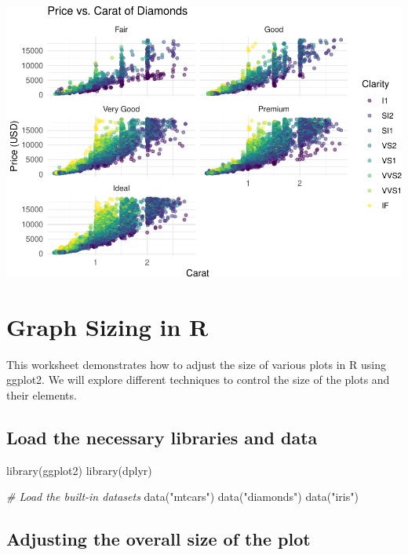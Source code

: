 \documentclass[
]{book}
\newenvironment{Shaded}{\begin{snugshade}}{\end{snugshade}}
\newcommand{\CommentTok}[1]{\textcolor[rgb]{0.56,0.35,0.01}{\textit{#1}}}
\newcommand{\FunctionTok}[1]{\textcolor[rgb]{0.00,0.00,0.00}{#1}}
\newcommand{\NormalTok}[1]{#1}
\newcommand{\StringTok}[1]{\textcolor[rgb]{0.31,0.60,0.02}{#1}}
\begin{document}
\includegraphics[width=1\linewidth]{graphformatting_files/figure-latex/unnamed-chunk-6-1}

\hypertarget{graph-sizing-in-r}{%
\section{Graph Sizing in R}\label{graph-sizing-in-r}}

This worksheet demonstrates how to adjust the size of various plots in R using ggplot2. We will explore different techniques to control the size of the plots and their elements.

\hypertarget{load-the-necessary-libraries-and-data}{%
\subsection{Load the necessary libraries and data}\label{load-the-necessary-libraries-and-data}}

\begin{Shaded}
\begin{Highlighting}[]
\FunctionTok{library}\NormalTok{(ggplot2)}
\FunctionTok{library}\NormalTok{(dplyr)}

\CommentTok{\# Load the built{-}in datasets}
\FunctionTok{data}\NormalTok{(}\StringTok{"mtcars"}\NormalTok{)}
\FunctionTok{data}\NormalTok{(}\StringTok{"diamonds"}\NormalTok{)}
\FunctionTok{data}\NormalTok{(}\StringTok{"iris"}\NormalTok{)}
\end{Highlighting}
\end{Shaded}

\hypertarget{adjusting-the-overall-size-of-the-plot}{%
\subsection{Adjusting the overall size of the plot}\label{adjusting-the-overall-size-of-the-plot}}
\end{document}
